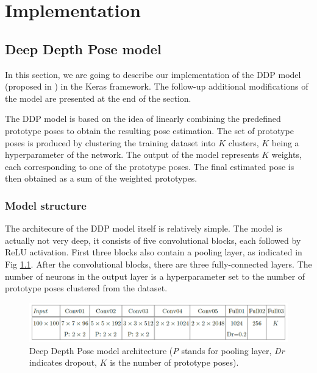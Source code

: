 \chapter{Implementation}\label{chap:implementation}


\section{Deep Depth Pose model}
In this section, we are going to describe our implementation of the DDP model (proposed in \cite{Marin18jvcir}) in the Keras framework. The follow-up additional modifications of the model are presented at the end of the section.\par
\vspace{5mm}
\noindent
The DDP model is based on the idea of linearly combining the predefined prototype poses to obtain the resulting pose estimation. The set of prototype poses is produced by clustering the training dataset into $K$ clusters, $K$ being a hyperparameter of the network. The output of the model represents $K$ weights, each corresponding to one of the prototype poses. The final estimated pose is then obtained as a sum of the weighted prototypes.


\subsection{Model structure}

The architecure of the DDP model itself is relatively simple. The model is actually not very deep, it consists of five convolutional blocks, each followed by ReLU activation. First three blocks also contain a pooling layer, as indicated in Fig \ref{fig:ddp}. After the convolutional blocks, there are three fully-connected layers. The number of neurons in the output layer is a hyperparameter set to the number of prototype poses clustered from the dataset. \par

\vspace{5mm}
\begin{figure}[H]
\begin{center}
  \includegraphics[width=\textwidth]{images/implementation/ddp.PNG}
  \caption[Deep Depth Pose model architecture \cite{Marin18jvcir}.]{Deep Depth Pose model architecture \cite{Marin18jvcir} (\textit{P} stands for pooling layer, \textit{Dr} indicates dropout, $K$ is the number of prototype poses).}
  \label{fig:ddp}
\end{center}
\end{figure}


